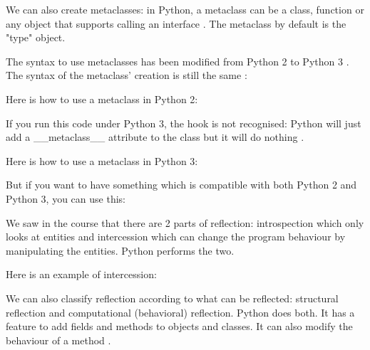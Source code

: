 We can also create metaclasses: in Python, a metaclass can be a class, function or any object that supports calling an interface \cite{pythoncentral_metaclasses}. The metaclass by default is the "type" object.

The syntax to use metaclasses has been modified from Python 2 to Python 3 \cite{mikewatkins_metaclasses}. The syntax of the metaclass' creation is still the same \cite{python_doc_datamodel}:


Here is how to use a metaclass in Python 2:

If you run this code under Python 3, the hook is not recognised: Python will just add a \_\_metaclass\_\_ attribute to the class but it will do nothing \cite{artima_metaclasses_1of2}.
\newline

Here is how to use a metaclass in Python 3:


But if you want to have something which is compatible with both Python 2 and Python 3, you can use this:


We saw in the course that there are 2 parts of reflection: introspection which only looks at entities and intercession which can change the program behaviour by manipulating the entities. %
Python performs the two.
\newline

Here is an example of intercession:


%
%
%
%
%
%
%
%
%
%
%

We can also classify reflection according to what can be reflected: structural reflection and computational (behavioral) reflection. %
Python does both. It has a feature to add fields and methods to objects and classes. It can also modify the behaviour of a method \cite{mendez2011computational}.

